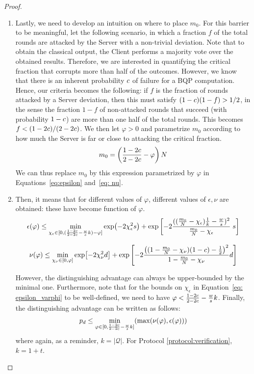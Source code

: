 \begin{proof}
\begin{enumerate}[label=\arabic*)]
    \item \label{item: m_0}
    Lastly, we need to develop an intuition on where to place $m_0$.
    For this barrier to be meaningful, let the following scenario, in which a fraction $f$ of the total rounds are attacked by the Server with a non-trivial deviation.
    Note that to obtain the classical output, the Client performs a majority vote over the obtained results.
    Therefore, we are interested in quantifying the critical fraction that corrupts more than half of the outcomes.
    However, we know that there is an inherent probability $c$ of failure for a BQP computation.
    Hence, our criteria becomes the following: if $f$ is the fraction of rounds attacked by a Server deviation, then this must satisfy $(1-c)(1-f)>1/2$, in the sense the fraction $1-f$ of non-attacked rounds that succeed (with probability $1-c$) are more than one half of the total rounds.
    This becomes $f<(1-2c)/(2-2c)$. We then let $\varphi>0$ and parametrize $m_0$ according to how much the Server is far or close to attacking the critical fraction.
    \begin{equation}
        m_0 = \left( \dfrac{1-2c}{2-2c}-\varphi\right)N
    \end{equation}
    We can thus replace $m_0$ by this expression parametrized by $\varphi$ in Equations~\ref{eq:epsilon} and~\ref{eq: nu}.
    \item Then, it means that for different values of $\varphi$, different values of $\epsilon, \nu$ are obtained: these have become function of $\varphi$.
    \begin{equation}
        \label{eq: epsilon_varphi}
        \epsilon(\varphi) \leq
        \min_{\chi_\epsilon\in[0, (\frac{1-2c}{2-2c}-\frac{w}{s}k)-\varphi ]}
        \exp(-2\chi_\epsilon^2 s) + \exp\left[
            -2\dfrac{( (\frac{m_0}{N}-\chi_\epsilon) \frac{1}{k}-\frac{w}{s} )^2}{ \frac{m_0}{N}-\chi_\epsilon } \; s
          \right]
    \end{equation}

    \begin{equation}
        \label{eq: nu_varphi}
        \nu(\varphi) \leq \min_{ \chi_\nu \in [0, \varphi] }
        \exp[ -2\chi_\nu^2 d ] + \exp\left[
            -2 \dfrac{ \left( (1-\frac{m_0}{N}-\chi_\nu)(1-c)-\frac{1}{2} \right)^2 }{1-\frac{m_0}{N}-\chi_\nu} d
         \right]
    \end{equation}

    However, the distinguishing advantage can always be upper-bounded by the minimal one.
    Furthermore, note that for the bounds on $\chi_\epsilon$ in Equation~\ref{eq: epsilon_varphi} to be well-defined, we need to have $\varphi < \frac{1-2c}{2-2c}-\frac{w}{s}k$.
    Finally, the distinguishing advantage can be written as follows:
    \begin{equation}
        p_d \leq \min_{\varphi \in [0, \frac{1-2c}{2-2c}-\frac{w}{s}k]} (\max(\nu(\varphi), \epsilon(\varphi)))
    \end{equation}
    where again, as a reminder, $k=|\mathcal Q|$.
    For Protocol \ref{protocol:verification}, $k=1+t$.


\end{enumerate}
\end{proof}
